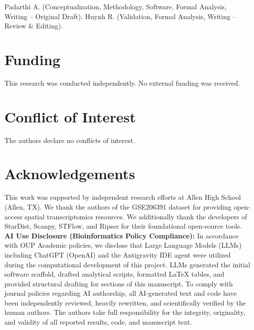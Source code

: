 \documentclass[nocrop]{bioinfo}
\newcommand{\fundingrequired}{This research was conducted independently. No external funding was received.}
\newcommand{\conflictrequired}{The authors declare no conflicts of interest.}
\newcommand{\contributionrequired}{Padarthi A. (Conceptualization, Methodology, Software, Formal Analysis, Writing -- Original Draft). Huynh R. (Validation, Formal Analysis, Writing -- Review \& Editing).}
\begin{document}
\contributionrequired

\section*{Funding}

\fundingrequired

\section*{Conflict of Interest}

\conflictrequired

\section*{Acknowledgements}
This work was supported by independent research efforts at Allen High School (Allen, TX). We thank the authors of the GSE206391 dataset for providing open-access spatial transcriptomics resources. We additionally thank the developers of StarDist, Scanpy, STFlow, and Ripser for their foundational open-source tools.
\vspace{1em}
\noindent \textbf{AI Use Disclosure (Bioinformatics Policy Compliance):}
In accordance with OUP Academic policies, we disclose that Large Language Models (LLMs) including ChatGPT (OpenAI) and the Antigravity IDE agent were utilized during the computational development of this project. LLMs generated the initial software scaffold, drafted analytical scripts, formatted LaTeX tables, and provided structural drafting for sections of this manuscript. To comply with journal policies regarding AI authorship, all AI-generated text and code have been independently reviewed, heavily rewritten, and scientifically verified by the human authors. The authors take full responsibility for the integrity, originality, and validity of all reported results, code, and manuscript text.



\end{document}
